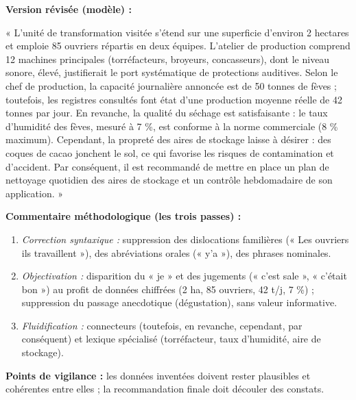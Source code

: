 \documentclass[11pt]{article}
\begin{document}
\begin{corrige}
\textbf{Version révisée (modèle) :}

« L'unité de transformation visitée s'étend sur une superficie d'environ 2 hectares et emploie 85 ouvriers répartis en deux équipes. L'atelier de production comprend 12 machines principales (torréfacteurs, broyeurs, concasseurs), dont le niveau sonore, élevé, justifierait le port systématique de protections auditives. Selon le chef de production, la capacité journalière annoncée est de 50 tonnes de fèves ; toutefois, les registres consultés font état d'une production moyenne réelle de 42 tonnes par jour. En revanche, la qualité du séchage est satisfaisante : le taux d'humidité des fèves, mesuré à 7 \%, est conforme à la norme commerciale (8 \% maximum). Cependant, la propreté des aires de stockage laisse à désirer : des coques de cacao jonchent le sol, ce qui favorise les risques de contamination et d'accident. Par conséquent, il est recommandé de mettre en place un plan de nettoyage quotidien des aires de stockage et un contrôle hebdomadaire de son application. »

\textbf{Commentaire méthodologique (les trois passes) :}
\begin{enumerate}
\item \emph{Correction syntaxique :} suppression des dislocations familières (« Les ouvriers ils travaillent »), des abréviations orales (« y'a »), des phrases nominales.
\item \emph{Objectivation :} disparition du « je » et des jugements (« c'est sale », « c'était bon ») au profit de données chiffrées (2 ha, 85 ouvriers, 42 t/j, 7 \%) ; suppression du passage anecdotique (dégustation), sans valeur informative.
\item \emph{Fluidification :} connecteurs (toutefois, en revanche, cependant, par conséquent) et lexique spécialisé (torréfacteur, taux d'humidité, aire de stockage).
\end{enumerate}
\textbf{Points de vigilance :} les données inventées doivent rester plausibles et cohérentes entre elles ; la recommandation finale doit découler des constats.
\end{corrige}
\end{document}
